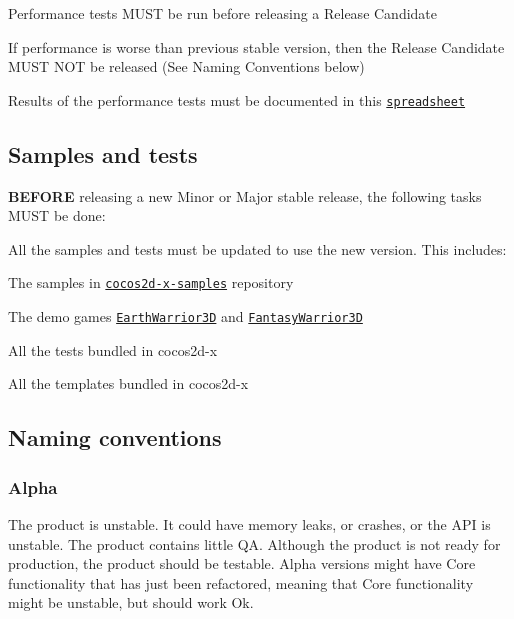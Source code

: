 \begin{DoxyItemize}
\item Performance tests M\+U\+ST be run before releasing a Release Candidate
\item If performance is worse than previous stable version, then the Release Candidate M\+U\+ST N\+OT be released (See Naming Conventions below)
\item Results of the performance tests must be documented in this \href{https://docs.google.com/spreadsheet/ccc?key=0AvvkdgVbWvpZdHFudzdDT3NuYTRNTHlZZzRGZWYzMmc#gid=8}{\tt spreadsheet}
\end{DoxyItemize}

\subsection*{Samples and tests}

{\bfseries B\+E\+F\+O\+RE} releasing a new Minor or Major stable release, the following tasks M\+U\+ST be done\+:


\begin{DoxyItemize}
\item All the samples and tests must be updated to use the new version. This includes\+:
\begin{DoxyItemize}
\item The samples in \href{https://github.com/cocos2d/cocos2d-x-samples}{\tt cocos2d-\/x-\/samples} repository
\item The demo games \href{https://github.com/chukong/EarthWarrior3D}{\tt Earth\+Warrior3D} and \href{https://github.com/chukong/FantasyWarrior3D}{\tt Fantasy\+Warrior3D}
\item All the tests bundled in cocos2d-\/x
\item All the templates bundled in cocos2d-\/x
\end{DoxyItemize}
\end{DoxyItemize}

\subsection*{Naming conventions}

\subsubsection*{Alpha}

The product is unstable. It could have memory leaks, or crashes, or the A\+PI is unstable. The product contains little QA. Although the product is not ready for production, the product should be testable. Alpha versions might have Core functionality that has just been refactored, meaning that Core functionality might be unstable, but should work Ok.

